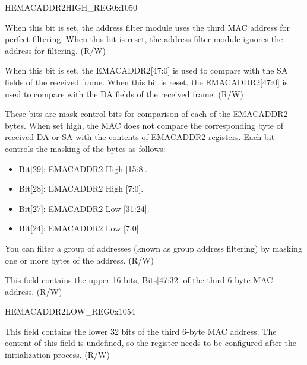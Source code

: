 \begin{register}{H}{EMACADDR2HIGH\_REG}{0x1050}\label{regdesc:EMACADDR2HIGHREG}
%
%
%
%
%
\regnewline%
\begin{regdesc}\begin{reglist}
\item [ADDRESS\_ENABLE2]When this bit is set, the address filter module uses the third MAC address  for perfect filtering. When this bit is reset, the address filter module ignores the address for filtering. (R/W)
\item [SOURCE\_ADDRESS2]When this bit is set, the EMACADDR2[47:0] is used to compare with the SA fields of the received frame. When this bit is reset, the EMACADDR2[47:0] is used to compare with the DA fields of the received frame. (R/W)
\item [MASK\_BYTE\_CONTROL2]These bits are mask control bits for comparison of each of the EMACADDR2 bytes. When set high, the MAC does not compare the corresponding byte of received DA or SA with the contents of EMACADDR2 registers. Each bit controls the masking of the bytes as follows: \begin{itemize}
\item Bit[29]: EMACADDR2 High [15:8]. \item Bit[28]: EMACADDR2 High [7:0]. \item Bit[27]: EMACADDR2 Low [31:24]. \item Bit[24]: EMACADDR2 Low [7:0].
\end{itemize} You can filter a group of addresses (known as group address filtering) by masking one or more bytes of the address. (R/W)
\item [MAC\_ADDRESS2\_HI]This field contains the upper 16 bits, Bits[47:32] of the third 6-byte MAC address. (R/W)
\end{reglist}\end{regdesc}
\end{register}


\begin{register}{H}{EMACADDR2LOW\_REG}{0x1054}\label{regdesc:EMACADDR2LOWREG}
%
\regnewline%
\begin{regdesc}\begin{reglist}
\item [EMACADDR2LOW\_REG]This field contains the lower 32 bits of the third 6-byte MAC address. The content of this field is undefined, so the register needs to be configured after the initialization process. (R/W)
\end{reglist}\end{regdesc}
\end{register}


